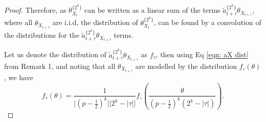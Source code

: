 \documentclass[english]{article}
\begin{document}
\begin{proof}
Therefore, as  $\theta_{X_t}^{\{2^k\}}$ can be written as a linear sum of the terms $\tilde{a}^{\{2^k\}}_{t+\tau} \theta_{X_{t+\tau}}$, where all $\theta_{X_{t+\tau}}$ are i.i.d,  the distribution of $\theta_{X_t}^{\{2^k\}}$, can be found by a convolution of the distributions for the $\tilde{a}^{\{2^k\}}_{t+\tau} \theta_{X_{t+\tau}}$ terms.

Let us denote the distribution of $\tilde{a}^{\{2^k\}}_{t+\tau} \theta_{X_{t+\tau}}$ as $f_\tau$, then using Eq \ref{eqn: aX dist} from Remark 1, and noting that all $\theta_{X_{t+\tau}}$ are modelled by the distribution $f_\circ(\theta)$, we have
\begin{equation}\label{eqn:29}
    f_\tau(\theta)=\frac{1}{\lvert(p-\frac{1}{2})^k\rvert\lvert2^k-\lvert\tau\rvert\rvert}f_\circ\left(\frac{\theta}{(p-\frac{1}{2})^k(2^k-\lvert\tau\rvert)}\right).
\end{equation}


\end{proof}
\end{document}
